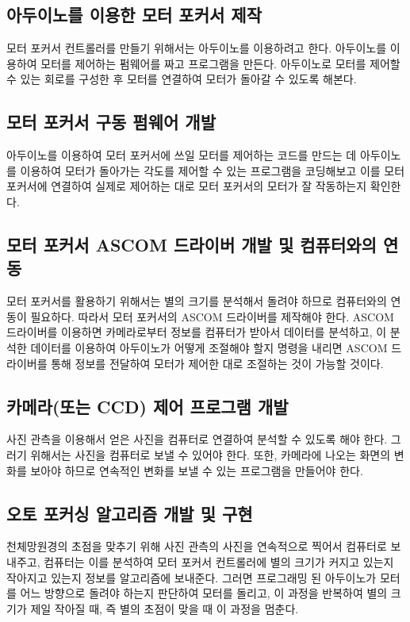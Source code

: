 \documentclass{abstract_hutech}
\begin{document}
\subsection{아두이노를 이용한 모터 포커서 제작}

모터 포커서 컨트롤러를 만들기 위해서는 아두이노를 이용하려고 한다. 아두이노를 이용하여 모터를 제어하는 펌웨어를 짜고 프로그램을 만든다. 아두이노로 모터를 제어할 수 있는 회로를 구성한 후 모터를 연결하여 모터가 돌아갈 수 있도록 해본다.

\subsection{모터 포커서 구동 펌웨어 개발}

아두이노를 이용하여 모터 포커서에 쓰일 모터를 제어하는 코드를 만드는 데 아두이노를 이용하여 모터가 돌아가는 각도를 제어할 수 있는 프로그램을 코딩해보고 이를 모터 포커서에 연결하여 실제로 제어하는 대로 모터 포커서의 모터가 잘 작동하는지 확인한다.

\subsection{모터 포커서 ASCOM 드라이버 개발 및 컴퓨터와의 연동}

모터 포커서를 활용하기 위해서는 별의 크기를 분석해서 돌려야 하므로 컴퓨터와의 연동이 필요하다. 따라서 모터 포커서의 ASCOM 드라이버를 제작해야 한다. ASCOM 드라이버를 이용하면 카메라로부터 정보를 컴퓨터가 받아서 데이터를 분석하고, 이 분석한 데이터를 이용하여 아두이노가 어떻게 조절해야 할지 명령을 내리면 ASCOM 드라이버를 통해 정보를 전달하여 모터가 제어한 대로 조절하는 것이 가능할 것이다.

\subsection{카메라(또는 CCD) 제어 프로그램 개발}

사진 관측을 이용해서 얻은 사진을 컴퓨터로 연결하여 분석할 수 있도록 해야 한다. 그러기 위해서는 사진을 컴퓨터로 보낼 수 있어야 한다. 또한, 카메라에 나오는 화면의 변화를 보아야 하므로 연속적인 변화를 보낼 수 있는 프로그램을 만들어야 한다.

\subsection{오토 포커싱 알고리즘 개발 및 구현}

천체망원경의 초점을 맞추기 위해 사진 관측의 사진을 연속적으로 찍어서 컴퓨터로 보내주고, 컴퓨터는 이를 분석하여 모터 포커서 컨트롤러에 별의 크기가 커지고 있는지 작아지고 있는지 정보를 알고리즘에 보내준다. 그러면 프로그래밍 된 아두이노가 모터를 어느 방향으로 돌려야 하는지 판단하여 모터를 돌리고, 이 과정을 반복하여 별의 크기가 제일 작아질 때, 즉 별의 초점이 맞을 때 이 과정을 멈춘다.
\end{document}
